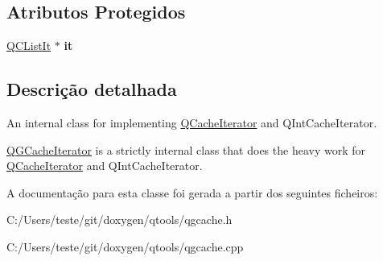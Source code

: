 \subsection*{Atributos Protegidos}
\begin{DoxyCompactItemize}
\item 
\hypertarget{class_q_g_cache_iterator_ac9fffd2ca46ddfd0a668eafbe5fcd318}{\hyperlink{class_q_c_list_it}{Q\-C\-List\-It} $\ast$ {\bfseries it}}\label{class_q_g_cache_iterator_ac9fffd2ca46ddfd0a668eafbe5fcd318}

\end{DoxyCompactItemize}


\subsection{Descrição detalhada}
An internal class for implementing \hyperlink{class_q_cache_iterator}{Q\-Cache\-Iterator} and Q\-Int\-Cache\-Iterator. 

\hyperlink{class_q_g_cache_iterator}{Q\-G\-Cache\-Iterator} is a strictly internal class that does the heavy work for \hyperlink{class_q_cache_iterator}{Q\-Cache\-Iterator} and Q\-Int\-Cache\-Iterator. 

A documentação para esta classe foi gerada a partir dos seguintes ficheiros\-:\begin{DoxyCompactItemize}
\item 
C\-:/\-Users/teste/git/doxygen/qtools/qgcache.\-h\item 
C\-:/\-Users/teste/git/doxygen/qtools/qgcache.\-cpp\end{DoxyCompactItemize}
